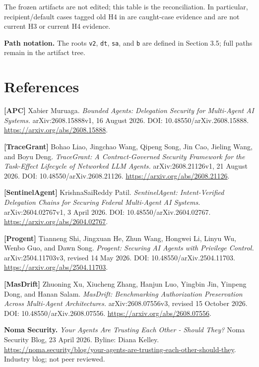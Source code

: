 \documentclass[
  10pt,
]{article}
\let\origtexttt\texttt
\renewcommand{\texttt}[1]{{\upshape\origtexttt{#1}}}
\renewcommand{\_}{\origunderscore\allowbreak}
\begin{document}
The frozen artifacts are not edited; this table is the reconciliation.
In particular, recipient/default cases tagged old H4 in
are caught-case evidence and are not current H3 or current H4 evidence.

\textbf{Path notation.} The roots \texttt{v2}, \texttt{dt}, \texttt{sa},
and \texttt{b} are defined in Section 3.5; full paths remain in the
artifact tree.

\section{References}\label{references}

\raggedright

\textbf{{[}APC{]}} Xabier Muruaga. \emph{Bounded Agents: Delegation
Security for Multi-Agent AI Systems.} arXiv:2608.15888v1, 16 August
2026. DOI: 10.48550/arXiv.2608.15888.
\url{https://arxiv.org/abs/2608.15888}.

\textbf{{[}TraceGrant{]}} Bohao Liao, Jingchao Wang, Qipeng Song, Jin
Cao, Jieling Wang, and Boyu Deng. \emph{TraceGrant: A Contract-Governed
Security Framework for the Task-Effect Lifecycle of Networked LLM
Agents.} arXiv:2608.21126v1, 21 August 2026. DOI:
10.48550/arXiv.2608.21126. \url{https://arxiv.org/abs/2608.21126}.

\textbf{{[}SentinelAgent{]}} KrishnaSaiReddy Patil. \emph{SentinelAgent:
Intent-Verified Delegation Chains for Securing Federal Multi-Agent AI
Systems.} arXiv:2604.02767v1, 3 April 2026. DOI:
10.48550/arXiv.2604.02767. \url{https://arxiv.org/abs/2604.02767}.

\textbf{{[}Progent{]}} Tianneng Shi, Jingxuan He, Zhun Wang, Hongwei Li,
Linyu Wu, Wenbo Guo, and Dawn Song. \emph{Progent: Securing AI Agents
with Privilege Control.} arXiv:2504.11703v3, revised 14 May 2026. DOI:
10.48550/arXiv.2504.11703. \url{https://arxiv.org/abs/2504.11703}.

\textbf{{[}MasDrift{]}} Zhuoning Xu, Xiucheng Zhang, Hanjun Luo, Yingbin
Jin, Yinpeng Dong, and Hanan Salam. \emph{MasDrift: Benchmarking
Authorization Preservation Across Multi-Agent Architectures.}
arXiv:2608.07556v3, revised 15 October 2026. DOI:
10.48550/arXiv.2608.07556. \url{https://arxiv.org/abs/2608.07556}.

\textbf{Noma Security.} \emph{Your Agents Are Trusting Each Other -
Should They?} Noma Security Blog, 23 April 2026. Byline: Diana Kelley.
\url{https://noma.security/blog/your-agents-are-trusting-each-other-should-they}.
Industry blog; not peer reviewed.
\end{document}
